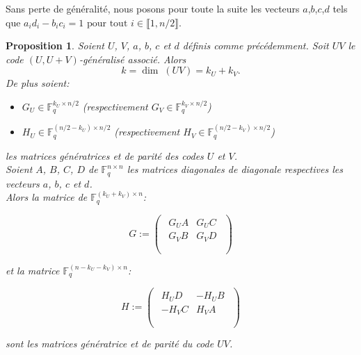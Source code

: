 \documentclass[12pt]{article}
\theoremstyle{plain}
\newtheorem{propo}[thm]{Proposition}
\theoremstyle{definition}
\newcommand{\F}{\mathbb{F}}
\begin{document}
\noindent Sans perte de généralité, nous posons pour toute la suite les vecteurs $a$,$b$,$c$,$d$ tels que $a_id_i - b_ic_i = 1 \text{ pour tout } i \in \llbracket 1,n/2\rrbracket$. \\

\begin{propo} Soient $U$, $V$, $a$, $b$, $c$ et $d$ définis comme précédemment. Soit $UV$ le code $(U,U+V)$-généralisé associé. Alors
$$ k = \dim\; (UV) = k_U + k_V.$$
De plus soient:
\begin{itemize}
\item$G_U \in \F_q^{k_U \times n/2}$ (respectivement $G_V \in \F_q^{k_V \times n/2}$)
\item$H_U \in \F_q^{(n/2-k_U) \times n/2}$ (respectivement $H_V \in \F_q^{(n/2-k_V) \times n/2}$) 
\end{itemize}  les matrices génératrices et de parité des codes $U$ et $V$. \\
Soient $A$, $B$, $C$, $D$ de $\F_q^{n \times n}$ les matrices diagonales de diagonale respectives les vecteurs $a$, $b$, $c$ et $d$.  \\
\noindent Alors la matrice de $\F_q^{(k_U + k_V) \times n}$: 

\vspace{0.1in}

$$
G := 
\begin{pmatrix}
\begin{array}{c|c}
G_UA & G_UC \\
 \hline 
G_VB & G_VD \\
\end{array} \\
\end{pmatrix}
$$

\noindent et la matrice $\F_q^{(n - k_U - k_V) \times n}$:

\vspace{0.1in}
$$ 
H :=
\begin{pmatrix}
\begin{array}{c|c}
H_UD & -H_UB \\
 \hline 
-H_VC & H_VA \\
\end{array} \\
\end{pmatrix}
$$
\vspace{0.1in}

\noindent sont les matrices génératrice et de parité du code $UV$. 
\end{propo}
\end{document}
